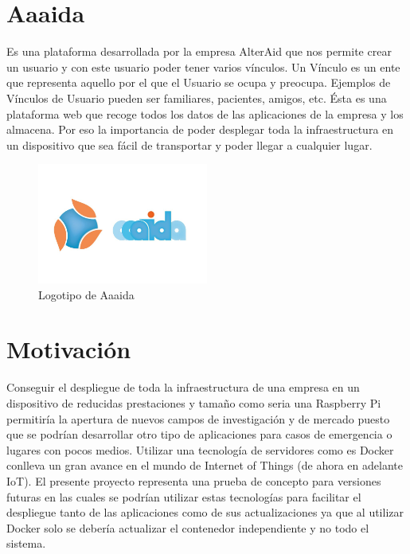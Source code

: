 \section{Aaaida}
Es una plataforma desarrollada por la empresa AlterAid que nos permite crear un usuario y con este usuario poder tener varios vínculos. Un Vínculo es un ente que representa aquello por el que el Usuario se ocupa y preocupa. Ejemplos de Vínculos de Usuario pueden ser familiares, pacientes, amigos, etc. 
Ésta es una plataforma web que recoge todos los datos de las aplicaciones de la empresa y los almacena. Por eso la importancia de poder desplegar toda la infraestructura en un dispositivo que sea fácil de transportar y poder llegar a cualquier lugar.
\newpage
\begin{figure}[htb]
\begin{center}
\includegraphics[width=0.5\textwidth]{./setup/aaaidaLogo}
\caption{Logotipo de Aaaida}
\label{F:prova}
\end{center}
\end{figure}





\section{Motivación}

Conseguir el despliegue de toda la infraestructura de una empresa en un dispositivo de reducidas prestaciones y tamaño como seria una Raspberry Pi permitiría la apertura de nuevos campos de investigación y de mercado puesto que se podrían desarrollar otro tipo de aplicaciones para casos de emergencia o lugares con pocos medios. 
Utilizar una tecnología de servidores como es Docker conlleva un gran avance en el mundo de Internet of Things (de ahora en adelante IoT).
El presente proyecto representa una prueba de concepto para versiones futuras en las cuales se podrían utilizar estas tecnologías para facilitar el despliegue tanto de las aplicaciones como de sus actualizaciones ya que al utilizar Docker solo se debería actualizar el contenedor independiente y no todo el sistema.
